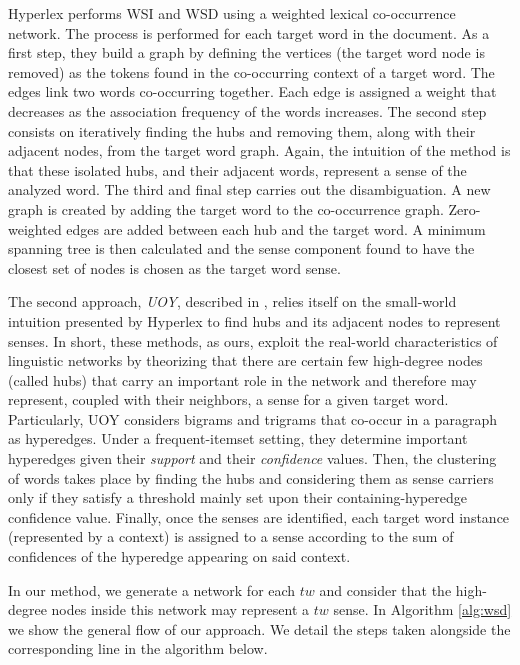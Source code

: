 Hyperlex performs WSI and WSD using a weighted lexical co-occurrence network. The process is performed for each target word in the document. As a first step, they build a  graph by defining the vertices (the target word node is removed) as the tokens found in the  co-occurring  context of a target word. The edges link two words co-occurring together. Each edge is assigned a weight that decreases as the association frequency of the words increases. The second step consists on iteratively finding the hubs and removing them, along with their adjacent nodes, from the target word graph. Again, the intuition of the method is that these isolated hubs, and their adjacent words, represent a sense of the analyzed word. The third and final step carries out the disambiguation. A new graph is created by adding the target word to the co-occurrence graph. Zero-weighted edges are added between each hub and the target word. A minimum spanning tree is then calculated and the sense component found to have the closest set of nodes is chosen as the target word sense.

The second approach, \textit{UOY}, described in \cite{2007.Klapaftis.UOY},  relies itself on the small-world intuition presented  by Hyperlex to find hubs and its adjacent nodes to represent senses.   In short, these methods, as ours, exploit the real-world characteristics of linguistic networks by theorizing that there are certain few high-degree nodes (called hubs) that carry an important role in the network and therefore may represent, coupled with their neighbors, a sense for a given target word. Particularly, UOY considers bigrams and trigrams that co-occur in a paragraph as hyperedges. Under a frequent-itemset setting, they determine important hyperedges given their \textit{support} and their \textit{confidence}  values. Then, the clustering of words takes place by finding the hubs and considering them as sense carriers only if they satisfy a threshold mainly set upon their containing-hyperedge confidence value. Finally, once the senses are identified, each target word instance (represented by a context) is assigned to a sense according to the sum of confidences of the hyperedge appearing on said context. 

In our method, we generate a network for each $tw$ and consider that the high-degree nodes inside this network may represent a $tw$ sense. In Algorithm \ref{alg:wsd} we show the general flow of our approach.  We detail the steps taken alongside the corresponding line in the algorithm below. 


